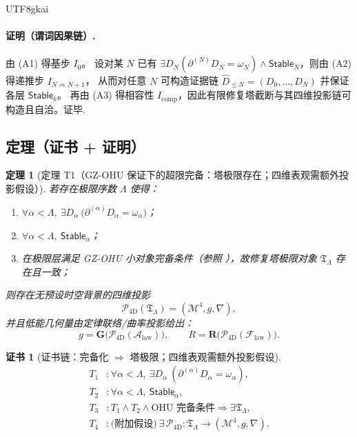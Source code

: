 \documentclass[12pt]{article}
\newtheorem{theorem}{定理}[section]
\newtheorem{Certificate}{证书}[section]
\begin{document}
\begin{CJK*}{UTF8}{gkai}
\paragraph{证明（谓词因果链）.}
由 (A1) 得基步 $I_0$。
设对某 $N$ 已有 $\exists D_N(\partial^{(N)}D_N=\omega_N)\wedge \mathsf{Stable}_N$，则由 (A2) 得递推步 $I_{N\Rightarrow N+1}$，
从而对任意 $N$ 可构造证据链 $\widehat{D}_{\le N}=(D_0,\dots,D_N)$ 并保证各层 $\mathsf{Stable}_k$。
再由 (A3) 得相容性 $I_{\mathrm{comp}}$，因此有限修复塔截断与其四维投影链可构造且自洽。证毕.

\subsection{定理（证书 + 证明）}
\label{subsec:tex29-chain-discrete-kqemb-tower-4d-theorem}

\begin{theorem}[定理 T1（GZ-OHU 保证下的超限完备：塔极限存在；四维表观需额外投影假设）]
\label{thm:tex29-chain5-ohu-4d}
若存在极限序数 $\Lambda$ 使得：
\begin{enumerate}
  \item[(U1)] $\forall \alpha<\Lambda,\ \exists D_{\alpha}\ \bigl(\partial^{(\alpha)}D_{\alpha}=\omega_{\alpha}\bigr)$；
  \item[(U2)] $\forall \alpha<\Lambda,\ \mathsf{Stable}_{\alpha}$；
  \item[(U3)] 在极限层满足 GZ-OHU 小对象完备条件（参照 \cite{GaoZheng2025GFramework}），故修复塔极限对象 $\mathfrak{T}_{\Lambda}$ 存在且一致；
\end{enumerate}
则存在无预设时空背景的四维投影
\[
  \mathcal{P}_{\mathrm{4D}}(\mathfrak{T}_{\Lambda})=(\mathcal{M}^{4},g,\nabla),
\]
并且低能几何量由定律联络/曲率投影给出：
\[
  g=\mathbf{G}\bigl(\mathcal{P}_{\mathrm{4D}}(\mathcal{A}_{\mathrm{law}})\bigr),\qquad
  R=\mathbf{R}\bigl(\mathcal{P}_{\mathrm{4D}}(\mathcal{F}_{\mathrm{law}})\bigr).
\]
\end{theorem}

\begin{Certificate}[证书链：完备化 $\Rightarrow$ 塔极限；四维表观需额外投影假设]
\label{cert:tex29-chain5-ohu-4d}
\[
\begin{aligned}
  T_1 &: \forall \alpha<\Lambda,\ \exists D_{\alpha}\ (\partial^{(\alpha)}D_{\alpha}=\omega_{\alpha}),\\
  T_2 &: \forall \alpha<\Lambda,\ \mathsf{Stable}_{\alpha},\\
  T_3 &: T_1\wedge T_2\wedge \text{OHU 完备条件}\Rightarrow \exists \mathfrak{T}_{\Lambda},\\
  T_4 &: \text{(附加假设)}\ \exists\,\mathcal{P}_{\mathrm{4D}}:\mathfrak{T}_{\Lambda}\to (\mathcal{M}^{4},g,\nabla).
\end{aligned}
\]
\end{Certificate}


\end{CJK*}
\end{document}
